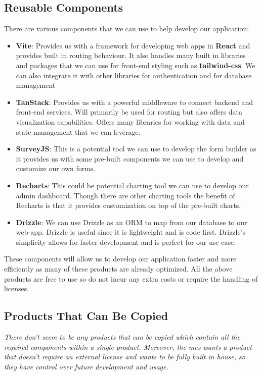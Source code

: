 \documentclass[12pt]{article}
\begin{document}
\subsection{Reusable Components}
There are various components that we can use to help develop our application:
\begin{itemize}
  \item \textbf{Vite}: Provides us with a framework for developing web apps in \textbf{React} and provides built in
    routing behaviour. It also handles many built in libraries and packages that we can use for front-end styling such
    as \textbf{tailwind-css}. We can also integrate it with other libraries for authentication and for database
    management
  \item \textbf{TanStack}: Provides us with a powerful middleware to connect backend and front-end services. Will
    primarily be used for routing but also offers data visualization capabilities. Offers many libraries for working
    with data and state management that we can leverage.
  \item \textbf{SurveyJS}: This is a potential tool we can use to develop the form builder as it provides us with some
    pre-built components we can use to develop and customize our own forms.
  \item \textbf{Recharts}: This could be potential charting tool we can use to develop our admin dashboard. Though there
    are other charting tools the benefit of Recharts is that it provides customization on top of the pre-built charts.
  \item \textbf{Drizzle}: We can use Drizzle as an ORM to map from our database to our web-app. Drizzle is useful since
    it is lightweight and is code first. Drizzle's simplicity allows for faster development and is perfect for our use
    case.
\end{itemize}
These components will allow us to develop our application faster and more efficiently as many of these products are
already optimized. All the above products are free to use so do not incur any extra costs or require the handling of
licenses.
\subsection{Products That Can Be Copied}
\textit{There don't seem to be any products that can be copied which contain all the required components within a single
product. Moreover, the \gls{mes} wants a product that doesn't require an external license and wants to be fully built in
house, so they have control over future development and usage.}
\end{document}

